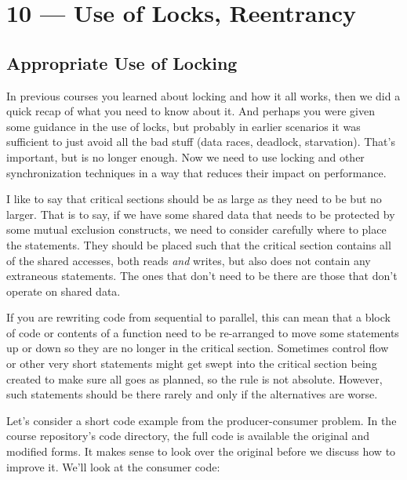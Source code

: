 \documentclass[a4paper]{report}
\begin{document}
\chapter*{10 --- Use of Locks, Reentrancy}


\section*{Appropriate Use of Locking}

In previous courses you learned about locking and how it all works, then we did a quick recap of what you need to know about it. And perhaps you were given some guidance in the use of locks, but probably in earlier scenarios it was sufficient to just avoid all the bad stuff (data races, deadlock, starvation). That's important, but is no longer enough. Now we need to use locking and other synchronization techniques in a way that reduces their impact on performance.

I like to say that critical sections should be as large as they need to be but no larger. That is to say, if we have some shared data that needs to be protected by some mutual exclusion constructs, we need to consider carefully where to place the statements. They should be placed such that the critical section contains all of the shared accesses, both reads \textit{and} writes, but also does not contain any extraneous statements. The ones that don't need to be there are those that don't operate on shared data.

If you are rewriting code from sequential to parallel, this can mean that a block of code or contents of a function need to be re-arranged to move some statements up or down so they are no longer in the critical section. Sometimes control flow or other very short statements might get swept into the critical section being created to make sure all goes as planned, so the rule is not absolute. However, such statements should be there rarely and only if the alternatives are worse.

Let's consider a short code example from the producer-consumer problem. In the course repository's code directory, the full code is available the original and modified forms. It makes sense to look over the original before we discuss how to improve it. We'll look at the consumer code:
\end{document}
